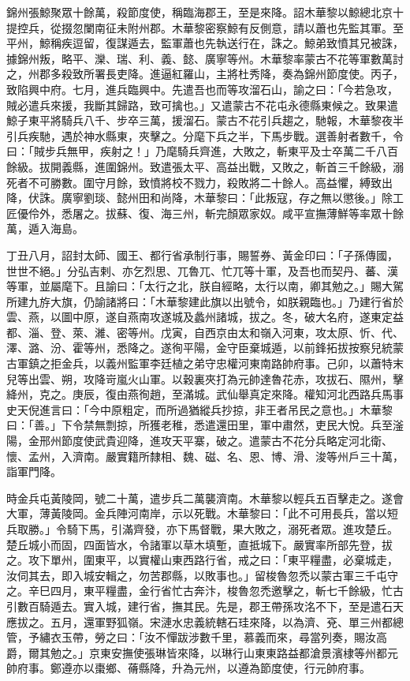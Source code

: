 \begin{pinyinscope}
 錦州張鯨聚眾十餘萬，殺節度使，稱臨海郡王，至是來降。詔木華黎以鯨總北京十提控兵，從掇忽闌南征未附州郡。木華黎密察鯨有反側意，請以蕭也先監其軍。至平州，鯨稱疾逗留，復謀遁去，監軍蕭也先執送行在，誅之。鯨弟致憤其兄被誅，據錦州叛，略平、灤、瑞、利、義、懿、廣寧等州。木華黎率蒙古不花等軍數萬討之，州郡多殺致所署長吏降。進逼紅羅山，主將杜秀降，奏為錦州節度使。丙子，致陷興中府。七月，進兵臨興中。先遣吾也而等攻溜石山，諭之曰：「今若急攻，賊必遣兵來援，我斷其歸路，致可擒也。」又遣蒙古不花屯永德縣東候之。致果遣鯨子東平將騎兵八千、步卒三萬，援溜石。蒙古不花引兵趨之，馳報，木華黎夜半引兵疾馳，遇於神水縣東，夾擊之。分麾下兵之半，下馬步戰。選善射者數千，令曰：「賊步兵無甲，疾射之！」乃麾騎兵齊進，大敗之，斬東平及士卒萬二千八百餘級。拔開義縣，進圍錦州。致遣張太平、高益出戰，又敗之，斬首三千餘級，溺死者不可勝數。圍守月餘，致憤將校不戮力，殺敗將二十餘人。高益懼，縛致出降，伏誅。廣寧劉琰、懿州田和尚降，木華黎曰：「此叛寇，存之無以懲後。」除工匠優伶外，悉屠之。拔蘇、復、海三州，斬完顏眾家奴。咸平宣撫薄鮮等率眾十餘萬，遁入海島。



 丁丑八月，詔封太師、國王、都行省承制行事，賜誓券、黃金印曰：「子孫傳國，世世不絕。」分弘吉剌、亦乞烈思、兀魯兀、忙兀等十軍，及吾也而契丹、蕃、漢等軍，並屬麾下。且諭曰：「太行之北，朕自經略，太行以南，卿其勉之。」賜大駕所建九斿大旗，仍諭諸將曰：「木華黎建此旗以出號令，如朕親臨也。」乃建行省於雲、燕，以圖中原，遂自燕南攻遂城及蠡州諸城，拔之。冬，破大名府，遂東定益都、淄、登、萊、濰、密等州。戊寅，自西京由太和嶺入河東，攻太原、忻、代、澤、潞、汾、霍等州，悉降之。遂徇平陽，金守臣棄城遁，以前鋒拓拔按察兒統蒙古軍鎮之拒金兵，以義州監軍李廷植之弟守忠權河東南路帥府事。己卯，以蕭特末兒等出雲、朔，攻降岢嵐火山軍。以穀裏夾打為元帥達魯花赤，攻拔石、隰州，擊絳州，克之。庚辰，復由燕徇趙，至滿城。武仙舉真定來降。權知河北西路兵馬事史天倪進言曰：「今中原粗定，而所過猶縱兵抄掠，非王者吊民之意也。」木華黎曰：「善。」下令禁無剽掠，所獲老稚，悉遣還田里，軍中肅然，吏民大悅。兵至滏陽，金邢州節度使武貴迎降，進攻天平寨，破之。遣蒙古不花分兵略定河北衛、懷、孟州，入濟南。嚴實籍所隸相、魏、磁、名、恩、博、滑、浚等州戶三十萬，詣軍門降。



 時金兵屯黃陵岡，號二十萬，遣步兵二萬襲濟南。木華黎以輕兵五百擊走之。遂會大軍，薄黃陵岡。金兵陣河南岸，示以死戰。木華黎曰：「此不可用長兵，當以短兵取勝。」令騎下馬，引滿齊發，亦下馬督戰，果大敗之，溺死者眾。進攻楚丘。楚丘城小而固，四面皆水，令諸軍以草木填塹，直抵城下。嚴實率所部先登，拔之。攻下單州，圍東平，以實權山東西路行省，戒之曰：「東平糧盡，必棄城走，汝伺其去，即入城安輯之，勿苦郡縣，以敗事也。」留梭魯忽禿以蒙古軍三千屯守之。辛巳四月，東平糧盡，金行省忙古奔汴，梭魯忽禿邀擊之，斬七千餘級，忙古引數百騎遁去。實入城，建行省，撫其民。先是，郡王帶孫攻洺不下，至是遣石天應拔之。五月，還軍野狐嶺。宋漣水忠義統轄石珪來降，以為濟、兗、單三州都總管，予繡衣玉帶，勞之曰：「汝不憚跋涉數千里，慕義而來，尋當列奏，賜汝高爵，爾其勉之。」京東安撫使張琳皆來降，以琳行山東東路益都滄景濱棣等州都元帥府事。鄭遵亦以棗鄉、蓨縣降，升為元州，以遵為節度使，行元帥府事。




\end{pinyinscope}
